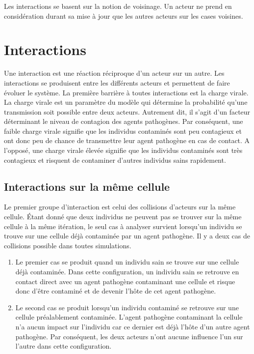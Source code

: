 Les interactions se basent sur la notion de voisinage. Un acteur ne prend en considération durant sa mise à jour que les autres acteurs sur les cases voisines.

\section{Interactions}

Une interaction est une réaction réciproque d'un acteur sur un autre. Les interactions se produisent entre les différents acteurs et permettent de faire évoluer le système. La première barrière à toutes interactions est la charge virale. La charge virale est un paramètre du modèle qui détermine la probabilité qu'une transmission soit possible entre deux acteurs. Autrement dit, il s'agit d'un facteur déterminant le niveau de contagion des agents pathogènes. Par conséquent, une faible charge virale signifie que les individus contaminés sont peu contagieux et ont donc peu de chance de transmettre leur agent pathogène en cas de contact. A l'opposé, une charge virale élevée signifie que les individus contaminés sont très contagieux et risquent de contaminer d'autres individus sains rapidement.\\

\subsection{Interactions sur la même cellule}

Le premier groupe d'interaction est celui des collisions d'acteurs sur la même cellule. Étant donné que deux individus ne peuvent pas se trouver sur la même cellule à la même itération, le seul cas à analyser survient lorsqu'un individu se trouve sur une cellule déjà contaminée par un agent pathogène. Il y a deux cas de collisions possible dans toutes simulations.

\begin{enumerate}
	\item Le premier cas se produit quand un individu sain se trouve sur une cellule déjà contaminée. Dans cette configuration, un individu sain se retrouve en contact direct avec un agent pathogène contaminant une cellule et risque donc d'être contaminé et de devenir l'hôte de cet agent pathogène.
	\item Le second cas se produit lorsqu'un individu contaminé se retrouve sur une cellule préalablement contaminée. L'agent pathogène contaminant la cellule n'a aucun impact sur l'individu car ce dernier est déjà l'hôte d'un autre agent pathogène. Par conséquent, les deux acteurs n'ont aucune influence l'un sur l'autre dans cette configuration.
\end{enumerate}

